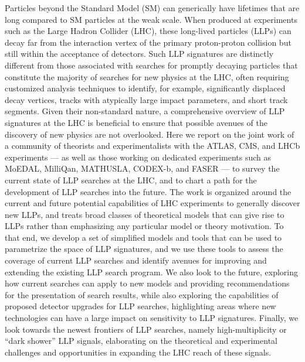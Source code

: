 Particles beyond the Standard Model (SM) can generically have lifetimes that are long compared to SM particles at the weak scale.
When produced at experiments such as the Large Hadron Collider (LHC), these long-lived particles (LLPs) can decay far from the interaction vertex of the primary proton-proton collision but still within the acceptance of detectors.
Such LLP signatures are distinctly different from those associated with searches for promptly decaying particles that constitute the majority of searches for new physics at the LHC, often requiring customized analysis techniques to identify, for example, significantly displaced decay vertices, tracks with atypically large impact parameters, and short track segments.
Given their non-standard nature, a comprehensive overview of LLP signatures at the LHC is beneficial to ensure that possible avenues of the discovery of new physics are not overlooked.
Here we report on the joint work of a community of theorists and experimentalists with the ATLAS, CMS, and LHCb experiments --- as well as those working on dedicated experiments such as MoEDAL, MilliQan, MATHUSLA, CODEX-b, and FASER --- to survey the current state of LLP searches at the LHC, and to chart a path for the development of LLP searches into the future.
The work is organized around the current and future potential capabilities of LHC experiments to generally discover new LLPs, and treats broad classes of theoretical models that can give rise to LLPs rather than emphasizing any particular model or theory motivation.
To that end, we develop a set of simplified models and tools that can be used to parametrize the space of LLP signatures, and we use these tools to assess the coverage of current LLP searches and identify avenues for improving and extending the existing LLP search program.
We also look to the future, exploring how current searches can apply to new models and providing recommendations for the presentation of search results, while also exploring the capabilities of proposed detector upgrades for LLP searches, highlighting areas where new technologies can have a large impact on sensitivity to LLP signatures.
Finally, we look towards the newest frontiers of LLP searches, namely high-multiplicity or ``dark shower'' LLP signals, elaborating on the theoretical and experimental challenges and opportunities in expanding the LHC reach of these signals.
